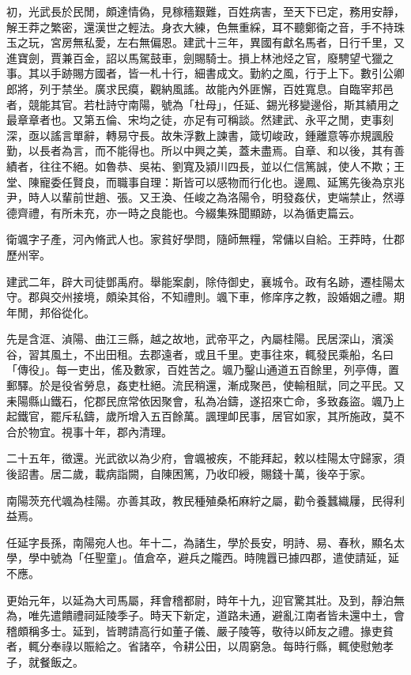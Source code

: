 
\begin{pinyinscope}
初，光武長於民閒，頗達情偽，見稼穡艱難，百姓病害，至天下已定，務用安靜，解王莽之繁密，還漢世之輕法。身衣大練，色無重綵，耳不聽鄭衛之音，手不持珠玉之玩，宮房無私愛，左右無偏恩。建武十三年，異國有獻名馬者，日行千里，又進寶劍，賈兼百金，詔以馬駕鼓車，劍賜騎士。損上林池烃之官，廢騁望弋獵之事。其以手跡賜方國者，皆一札十行，細書成文。勤約之風，行于上下。數引公卿郎將，列于禁坐。廣求民瘼，觀納風謠。故能內外匪懈，百姓寬息。自臨宰邦邑者，競能其官。若杜詩守南陽，號為「杜母」，任延、錫光移變邊俗，斯其績用之最章章者也。又第五倫、宋均之徒，亦足有可稱談。然建武、永平之閒，吏事刻深，亟以謠言單辭，轉易守長。故朱浮數上諫書，箴切峻政，鍾離意等亦規諷殷勤，以長者為言，而不能得也。所以中興之美，蓋未盡焉。自章、和以後，其有善績者，往往不絕。如魯恭、吳祐、劉寬及潁川四長，並以仁信篤誠，使人不欺；王堂、陳寵委任賢良，而職事自理：斯皆可以感物而行化也。邊鳳、延篤先後為京兆尹，時人以輩前世趙、張。又王渙、任峻之為洛陽令，明發姦伏，吏端禁止，然導德齊禮，有所未充，亦一時之良能也。今綴集殊聞顯跡，以為循吏篇云。

衛颯字子產，河內脩武人也。家貧好學問，隨師無糧，常傭以自給。王莽時，仕郡歷州宰。

建武二年，辟大司徒鄧禹府。舉能案劇，除侍御史，襄城令。政有名跡，遷桂陽太守。郡與交州接境，頗染其俗，不知禮則。颯下車，修庠序之教，設婚姻之禮。期年閒，邦俗從化。

先是含洭、湞陽、曲江三縣，越之故地，武帝平之，內屬桂陽。民居深山，濱溪谷，習其風土，不出田租。去郡遠者，或且千里。吏事往來，輒發民乘船，名曰「傳役」。每一吏出，傜及數家，百姓苦之。颯乃鑿山通道五百餘里，列亭傳，置郵驛。於是役省勞息，姦吏杜絕。流民稍還，漸成聚邑，使輸租賦，同之平民。又耒陽縣山鐵石，佗郡民庶常依因聚會，私為冶鑄，遂招來亡命，多致姦盜。颯乃上起鐵官，罷斥私鑄，歲所增入五百餘萬。諷理卹民事，居官如家，其所施政，莫不合於物宜。視事十年，郡內清理。

二十五年，徵還。光武欲以為少府，會颯被疾，不能拜起，敕以桂陽太守歸家，須後詔書。居二歲，載病詣闕，自陳困篤，乃收印綬，賜錢十萬，後卒于家。

南陽茨充代颯為桂陽。亦善其政，教民種殖桑柘麻紵之屬，勸令養蠶織屨，民得利益焉。

任延字長孫，南陽宛人也。年十二，為諸生，學於長安，明詩、易、春秋，顯名太學，學中號為「任聖童」。值倉卒，避兵之隴西。時隗囂已據四郡，遣使請延，延不應。

更始元年，以延為大司馬屬，拜會稽都尉，時年十九，迎官驚其壯。及到，靜泊無為，唯先遣饋禮祠延陵季子。時天下新定，道路未通，避亂江南者皆未還中土，會稽頗稱多士。延到，皆聘請高行如董子儀、嚴子陵等，敬待以師友之禮。掾吏貧者，輒分奉祿以賑給之。省諸卒，令耕公田，以周窮急。每時行縣，輒使慰勉孝子，就餐飯之。


\end{pinyinscope}

